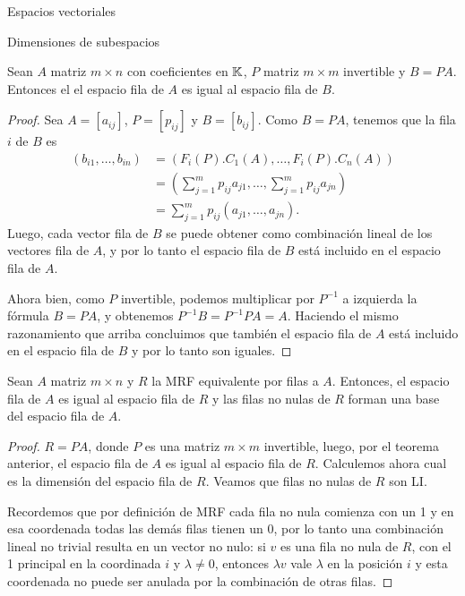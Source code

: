 \begin{chapter}{Espacios vectoriales}
\begin{section}{Dimensiones de subespacios}
        \begin{teorema}
            Sean $A$ matriz $m \times n$ con coeficientes en $\mathbb K$, $P$ matriz $m\times m$ invertible y $B =PA$. Entonces el el espacio fila de $A$ es igual al espacio fila de $B$.
        \end{teorema}
        \begin{proof}
            Sea $A= [a_{ij}]$, $P =[p_{ij}]$ y $B = [b_{ij}]$. Como  $B= PA$, tenemos que la fila $i$ de $B$ es
            \begin{align*}
                (b_{i1},\ldots,b_{in})&= (F_i(P).C_1(A),\ldots,F_i(P).C_n(A)) \\
                &= (\sum_{j=1}^{m} p_{ij}a_{j1}, \ldots, \sum_{j=1}^{m} p_{ij}a_{jn}) \\
                &= \sum_{j=1}^{m} p_{ij}(a_{j1}, \ldots,a_{jn}).
            \end{align*}
        Luego, cada vector fila de $B$ se puede obtener como combinación lineal de los vectores fila de $A$, y por lo tanto el espacio fila de $B$ está incluido en el espacio fila de $A$. 
        
        Ahora bien, como $P$ invertible, podemos multiplicar por $P^{-1}$ a izquierda la fórmula $B= PA$, y obtenemos $P^{-1}B = P^{-1}P A = A$. Haciendo el mismo razonamiento que arriba concluimos que  también el espacio fila de $A$ está incluido en el espacio fila de $B$ y por lo tanto son iguales. 
        \end{proof}
    
    \begin{corolario}\label{subesp-merf}
            Sean $A$ matriz $m \times n$ y $R$ la MRF equivalente por filas a $A$. Entonces, el espacio fila de $A$ es igual al espacio fila de $R$ y las filas no nulas de $R$ forman una base del espacio fila de $A$. 
    \end{corolario}
    \begin{proof}
        $R=PA$, donde $P$ es una matriz $m \times m$ invertible, luego, por el teorema anterior, el espacio fila de $A$  es igual al espacio fila de $R$. Calculemos ahora cual es la dimensión del espacio fila de $R$. Veamos que filas no nulas de $R$ son LI. 
        
        Recordemos  que por definición de MRF cada fila no nula comienza con un 1 y en esa coordenada  todas las demás filas tienen un 0, por lo tanto una combinación lineal no trivial resulta en un vector no nulo: si $v$ es una fila no nula de $R$, con el 1 principal en la coordinada $i$ y $\lambda \ne0$,  entonces $\lambda v$ vale $\lambda$ en la posición $i$ y esta coordenada no puede ser anulada por la combinación de otras filas.  
    \end{proof}


\end{section}
\end{chapter}
